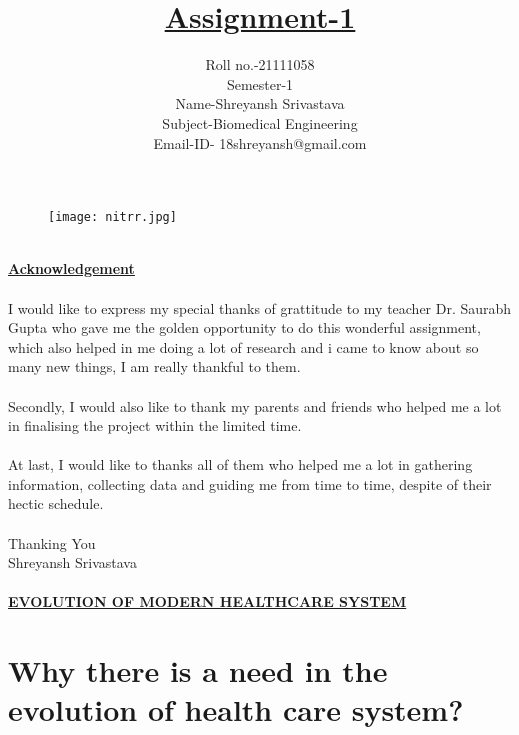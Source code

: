 \documentclass[12pt]{article}
\title{\textbf{\underline{Assignment-1}}}
\date{Roll no.-21111058\\Semester-1\\\Large {Name-Shreyansh Srivastava}\\Subject-Biomedical Engineering\\Email-ID- 18shreyansh@gmail.com}
\begin{document}
	\maketitle
	\begin{figure}[h]
		\centering
		\texttt{[image: nitrr.jpg]}
	\end{figure}
	\clearpage
	\begin{Acknowledgement}
		\\\Huge{\textbf{\underline{Acknowledgement}}}\\
		\\\large I would like to express my special thanks of grattitude to my teacher Dr. Saurabh Gupta who gave me the golden opportunity to do this wonderful assignment, which also helped in me doing a lot of research and i came to know about so many new things, I am really thankful to them.\\\\
		Secondly, I would also like to thank my parents and friends who helped me a lot in finalising the project within the limited time.\\\\
		At last, I would like to thanks all of them who helped me a lot in gathering information, collecting data and guiding me from time to time, despite of their hectic schedule.\\\\
		Thanking You\\
		Shreyansh Srivastava
	\end{Acknowledgement}
    \clearpage
    \paragraph{\textbf{\underline{\Large EVOLUTION OF MODERN HEALTHCARE SYSTEM}}}
    
    \section{\textbf{Why there is a need in the evolution of health care system?}}
\end{document}
